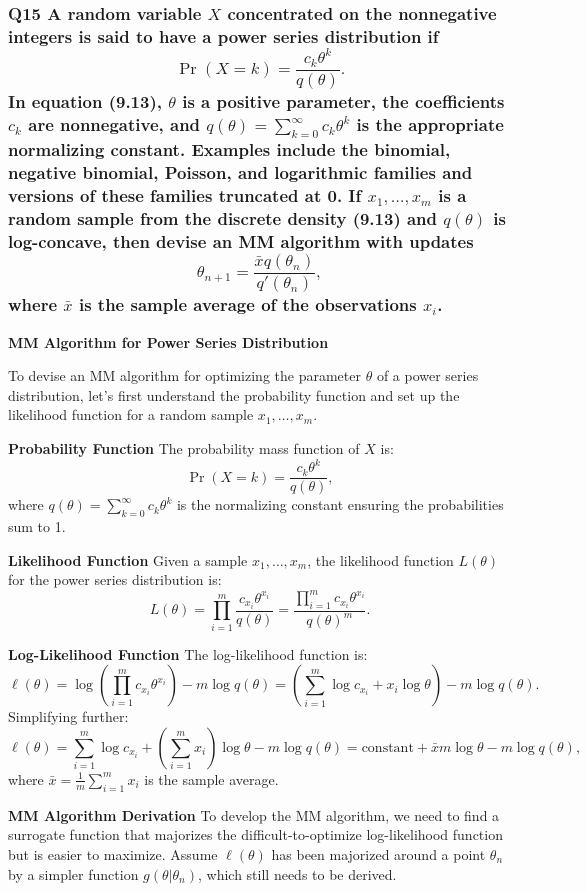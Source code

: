 \documentclass[8pt]{article}
\begin{document}
{\subsubsection*{Q15 A random variable \(X\) concentrated on the nonnegative integers is said to have a power series distribution if
\[
\Pr(X = k) = \frac{c_k \theta^k}{q(\theta)}.
\]
In equation (9.13), \(\theta\) is a positive parameter, the coefficients \(c_k\) are nonnegative, and \(q(\theta) = \sum_{k=0}^\infty c_k \theta^k\) is the appropriate normalizing constant. Examples include the binomial, negative binomial, Poisson, and logarithmic families and versions of these families truncated at 0. If \(x_1, \ldots, x_m\) is a random sample from the discrete density (9.13) and \(q(\theta)\) is log-concave, then devise an MM algorithm with updates
\[
\theta_{n+1} = \frac{\bar{x} q(\theta_n)}{q'(\theta_n)},
\]
where \(\bar{x}\) is the sample average of the observations \(x_i\).}

\textbf{MM Algorithm for Power Series Distribution}

To devise an MM algorithm for optimizing the parameter \(\theta\) of a power series distribution, let's first understand the probability function and set up the likelihood function for a random sample \(x_1, \ldots, x_m\).

\textbf{Probability Function}
The probability mass function of \(X\) is:
\[
\Pr(X = k) = \frac{c_k \theta^k}{q(\theta)},
\]
where \(q(\theta) = \sum_{k=0}^\infty c_k \theta^k\) is the normalizing constant ensuring the probabilities sum to 1.

\textbf{Likelihood Function}
Given a sample \(x_1, \ldots, x_m\), the likelihood function \(L(\theta)\) for the power series distribution is:
\[
L(\theta) = \prod_{i=1}^m \frac{c_{x_i} \theta^{x_i}}{q(\theta)} = \frac{\prod_{i=1}^m c_{x_i} \theta^{x_i}}{q(\theta)^m}.
\]

\textbf{Log-Likelihood Function}
The log-likelihood function is:
\[
\ell(\theta) = \log \left(\prod_{i=1}^m c_{x_i} \theta^{x_i}\right) - m \log q(\theta) = \left(\sum_{i=1}^m \log c_{x_i} + x_i \log \theta \right) - m \log q(\theta).
\]
Simplifying further:
\[
\ell(\theta) = \sum_{i=1}^m \log c_{x_i} + \left(\sum_{i=1}^m x_i\right) \log \theta - m \log q(\theta) = \text{constant} + \bar{x} m \log \theta - m \log q(\theta),
\]
where \(\bar{x} = \frac{1}{m} \sum_{i=1}^m x_i\) is the sample average.

\textbf{MM Algorithm Derivation}
To develop the MM algorithm, we need to find a surrogate function that majorizes the difficult-to-optimize log-likelihood function but is easier to maximize. Assume \(\ell(\theta)\) has been majorized around a point \(\theta_n\) by a simpler function \(g(\theta | \theta_n)\), which still needs to be derived.

}
\end{document}
